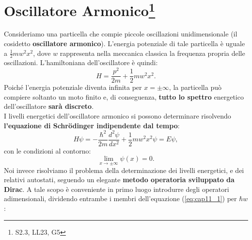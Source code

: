 \documentclass[a4paper,12pt,oneside]{book}
\newcommand*{\myfont}{\fontfamily{ppl}\selectfont}
\begin{document}
\fancypagestyle{plain}{%
\fancyhf{} %
\fancyfoot[C]{\bfseries \myfont{\thepage}} %
\renewcommand{\headrulewidth}{0pt}
\renewcommand{\footrulewidth}{0pt}}

\fancypagestyle{VS}{
\headheight = 15pt
\lhead[\myfont{\textit{\textbf{\thechapter\nouppercase{\leftmark}}}}]{\myfont{\textit{\textbf{\nouppercase{\leftmark}}}}}
\chead[]{}
\rhead[\myfont{\textbf{\thepage}}]{\myfont{\textbf{\thepage}}}

\lfoot[]{}
\cfoot[]{}
\rfoot[]{}
}



\pagestyle{VS}
\setcounter{chapter}{10}
\setcounter{page}{128}
\chapter[Oscillatore Armonico]{Oscillatore Armonico\footnote{S2.3, LL23, G5}}
Consideriamo una particella che compie piccole oscillazioni unidimensionale (il cosidetto \textbf{oscillatore armonico}). L'energia potenziale di tale particella è uguale a $\frac{1}{2}mw^2x^2$, dove $w$ rappresenta nella meccanica classica la frequenza propria delle oscillazioni. L'hamiltoniana dell'oscillatore è quindi:
\begin{equation}
H=\frac{p^2}{2m}+\frac{1}{2}mw^2x^2.
\label{eq:cap11_1}
\end{equation}
Poiché l'energia potenziale diventa infinita per $x=\pm \infty$, la particella può compiere soltanto un moto finito e, di conseguenza,  \textbf{tutto lo spettro} energetico dell'oscillatore \textbf{sarà discreto}.\\
 I livelli energetici dell'oscillatore armonico si possono determinare risolvendo \textbf{l'equazione di Schr\"{o}dinger indipendente dal tempo}:
\begin{equation}
H\psi= -\frac{\hbar^2}{2m}\frac{d^2\psi}{dx^2}+\frac{1}{2}mw^2x^2\psi=E\psi,
\end{equation}
con le condizioni al contorno:
\begin{equation}
\lim _{x \rightarrow \pm \infty} \psi(x)=0.
\end{equation}
Noi invece risolviamo il problema della determinazione dei livelli energetici, e dei relativi autostati, seguendo un elegante \textbf{metodo operatoria sviluppato da Dirac}.
 A tale scopo è conveniente in primo luogo introdurre degli operatori adimensionali, dividendo entrambe i membri dell'equazione (\ref{eq:cap11_1}) per $\hbar w$:
\end{document}
